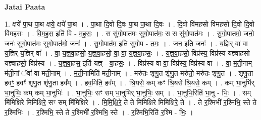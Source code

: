 \documentclass[17pt]{extarticle}
\begin{document}
\textbf{Jatai Paata} \newline

1. क्षये॑ पा॒थ पा॒थ क्षये॒ क्षये॑ पा॒थ । . पा॒था दि॒वो दि॒वः पा॒थ पा॒था दि॒वः । . दि॒वो वि॑महसो विमहसो दि॒वो दि॒वो वि॑महसः । . वि॒म॒ह॒स॒ इति॑ वि - म॒ह॒सः॒ । . स सु॑गो॒पात॑मः सुगो॒पात॑मः॒ स स सु॑गो॒पात॑मः । . सु॒गो॒पात॑मो॒ जनो॒ जनः॑ सुगो॒पात॑मः सुगो॒पात॑मो॒ जनः॑ । . सु॒गो॒पात॑म॒ इति॑ सुगो॒प - त॒मः॒ । . जन॒ इति॒ जनः॑ । . य॒ज्ञिर् वा॑ वा य॒ज्ञिर् य॒ज्ञिर् वा᳚ । . वा॒ य॒ज्ञ्॒वा॒ह॒सो॒ य॒ज्ञ्॒वा॒ह॒सो॒ वा॒ वा॒ य॒ज्ञ्॒वा॒ह॒सः॒ । . य॒ज्ञ्॒वा॒ह॒सो॒ विप्र॑स्य॒ विप्र॑स्य यज्ञ्वाहसो यज्ञ्वाहसो॒ विप्र॑स्य । . य॒ज्ञ्॒वा॒ह॒स॒ इति॑ यज्ञ् - वा॒ह॒सः॒ । . विप्र॑स्य वा वा॒ विप्र॑स्य॒ विप्र॑स्य वा । . वा॒ म॒ती॒नाम् म॑ती॒नां ॅवा॑ वा मती॒नाम् । . म॒ती॒नामिति॑ मती॒नाम् । . मरु॑तः शृणु॒त शृ॑णु॒त मरु॑तो॒ मरु॑तः शृणु॒त । . शृ॒णु॒ता हवꣳ॒॒ हवꣳ॑ शृणु॒त शृ॑णु॒ता हव᳚म् । . हव॒मिति॒ हव᳚म् । . श्रि॒यसे॒ कम् कꣳ श्रि॒यसे᳚ श्रि॒यसे॒ कम् । . कम् भा॒नुभि॑र् भा॒नुभिः॒ कम् कम् भा॒नुभिः॑ । . भा॒नुभिः॒ सꣳ सम् भा॒नुभि॑र् भा॒नुभिः॒ सम् । . भा॒नुभि॒रिति॑ भा॒नु - भिः॒ । . सम् मि॑मिक्षिरे मिमिक्षिरे॒ सꣳ सम् मि॑मिक्षिरे । . मि॒मि॒क्षि॒रे॒ ते ते मि॑मिक्षिरे मिमिक्षिरे॒ ते । . ते र॒श्मिभी॑ र॒श्मिभि॒ स्ते ते र॒श्मिभिः॑ । . र॒श्मिभि॒ स्ते ते र॒श्मिभी॑ र॒श्मिभि॒ स्ते । . र॒श्मिभि॒रिति॑ र॒श्मि - भिः॒ । \newline
\end{document}
